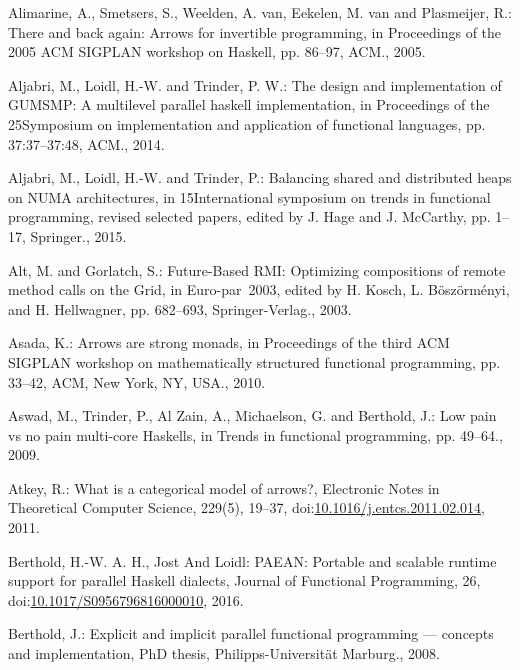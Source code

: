 \documentclass[paper=A4,twoside=true,openright,parskip=full,chapterprefix=true,headings=normal,bibliography=totoc,listof=totoc,titlepage=on,captions=tableabove,draft=false,british]{scrreprt}%
\begin{document}
\leavevmode\hypertarget{ref-Alimarine:2005:BAA:1088348.1088357}{}%
Alimarine, A., Smetsers, S., Weelden, A. van, Eekelen, M. van and
Plasmeijer, R.: There and back again: Arrows for invertible programming,
in Proceedings of the 2005 ACM SIGPLAN workshop on Haskell, pp. 86--97,
ACM., 2005.

\leavevmode\hypertarget{ref-Aljabri:2013:DIG:2620678.2620682}{}%
Aljabri, M., Loidl, H.-W. and Trinder, P. W.: The design and
implementation of GUMSMP: A multilevel parallel haskell implementation,
in Proceedings of the 25Symposium on implementation and application of
functional languages, pp. 37:37--37:48, ACM., 2014.

\leavevmode\hypertarget{ref-Aljabri2015}{}%
Aljabri, M., Loidl, H.-W. and Trinder, P.: Balancing shared and
distributed heaps on NUMA architectures, in 15International symposium on
trends in functional programming, revised selected papers, edited by J.
Hage and J. McCarthy, pp. 1--17, Springer., 2015.

\leavevmode\hypertarget{ref-AlGo03a}{}%
Alt, M. and Gorlatch, S.: Future-Based RMI: Optimizing compositions of
remote method calls on the Grid, in Euro-par~2003, edited by H. Kosch,
L. Böszörményi, and H. Hellwagner, pp. 682--693, Springer-Verlag., 2003.

\leavevmode\hypertarget{ref-Asada:2010:ASM:1863597.1863607}{}%
Asada, K.: Arrows are strong monads, in Proceedings of the third ACM
SIGPLAN workshop on mathematically structured functional programming,
pp. 33--42, ACM, New York, NY, USA., 2010.

\leavevmode\hypertarget{ref-aswad2009low}{}%
Aswad, M., Trinder, P., Al Zain, A., Michaelson, G. and Berthold, J.:
Low pain vs no pain multi-core Haskells, in Trends in functional
programming, pp. 49--64., 2009.

\leavevmode\hypertarget{ref-ATKEY201119}{}%
Atkey, R.: What is a categorical model of arrows?, Electronic Notes in
Theoretical Computer Science, 229(5), 19--37,
doi:\href{https://doi.org/10.1016/j.entcs.2011.02.014}{10.1016/j.entcs.2011.02.014},
2011.

\leavevmode\hypertarget{ref-berthold_loidl_hammond_2016}{}%
Berthold, H.-W. A. H., Jost And Loidl: PAEAN: Portable and scalable
runtime support for parallel Haskell dialects, Journal of Functional
Programming, 26,\linebreak
doi:\href{https://doi.org/10.1017/S0956796816000010}{10.1017/S0956796816000010},
2016.

\leavevmode\hypertarget{ref-JostThesis}{}%
Berthold, J.: Explicit and implicit parallel functional programming ---
concepts and implementation, PhD thesis, Philipps-Universität Marburg.,
2008.
\end{document}
